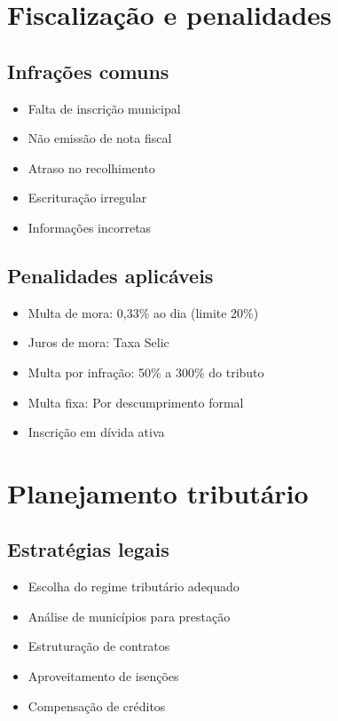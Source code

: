 \documentclass[12pt,a4paper]{article}
\begin{document}
\section{Fiscalização e penalidades}

\subsection{Infrações comuns}
\begin{itemize}
    \item Falta de inscrição municipal
    \item Não emissão de nota fiscal
    \item Atraso no recolhimento
    \item Escrituração irregular
    \item Informações incorretas
\end{itemize}

\subsection{Penalidades aplicáveis}
\begin{itemize}
    \item Multa de mora: 0,33\% ao dia (limite 20\%)
    \item Juros de mora: Taxa Selic
    \item Multa por infração: 50\% a 300\% do tributo
    \item Multa fixa: Por descumprimento formal
    \item Inscrição em dívida ativa
\end{itemize}

\section{Planejamento tributário}

\subsection{Estratégias legais}
\begin{itemize}
    \item Escolha do regime tributário adequado
    \item Análise de municípios para prestação
    \item Estruturação de contratos
    \item Aproveitamento de isenções
    \item Compensação de créditos
\end{itemize}
\end{document}
